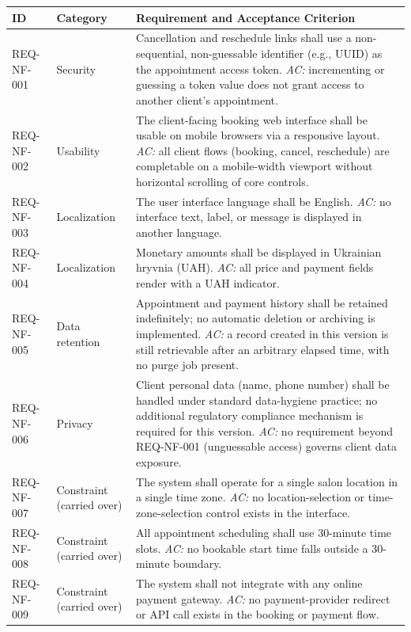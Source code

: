 \documentclass[11pt,a4paper]{article}
\begin{document}
\begin{longtable}{L{1.9cm}L{2.6cm}L{9.9cm}}
\toprule
ID & Category & Requirement and Acceptance Criterion \\
\midrule
\endhead
REQ-NF-001 & Security & Cancellation and reschedule links shall use a
  non-sequential, non-guessable identifier (e.g., UUID) as the appointment
  access token. \emph{AC:} incrementing or guessing a token value does not
  grant access to another client's appointment. \\
REQ-NF-002 & Usability & The client-facing booking web interface shall be
  usable on mobile browsers via a responsive layout. \emph{AC:} all client
  flows (booking, cancel, reschedule) are completable on a mobile-width
  viewport without horizontal scrolling of core controls. \\
REQ-NF-003 & Localization & The user interface language shall be English.
  \emph{AC:} no interface text, label, or message is displayed in another
  language. \\
REQ-NF-004 & Localization & Monetary amounts shall be displayed in
  Ukrainian hryvnia (UAH). \emph{AC:} all price and payment fields render
  with a UAH indicator. \\
REQ-NF-005 & Data retention & Appointment and payment history shall be
  retained indefinitely; no automatic deletion or archiving is implemented.
  \emph{AC:} a record created in this version is still retrievable after
  an arbitrary elapsed time, with no purge job present. \\
REQ-NF-006 & Privacy & Client personal data (name, phone number) shall be
  handled under standard data-hygiene practice; no additional regulatory
  compliance mechanism is required for this version. \emph{AC:} no
  requirement beyond REQ-NF-001 (unguessable access) governs client data
  exposure. \\
REQ-NF-007 & Constraint (carried over) & The system shall operate for a
  single salon location in a single time zone. \emph{AC:} no
  location-selection or time-zone-selection control exists in the
  interface. \\
REQ-NF-008 & Constraint (carried over) & All appointment scheduling shall
  use 30-minute time slots. \emph{AC:} no bookable start time falls outside
  a 30-minute boundary. \\
REQ-NF-009 & Constraint (carried over) & The system shall not integrate
  with any online payment gateway. \emph{AC:} no payment-provider redirect
  or API call exists in the booking or payment flow. \\
\bottomrule
\end{longtable}
\end{document}
